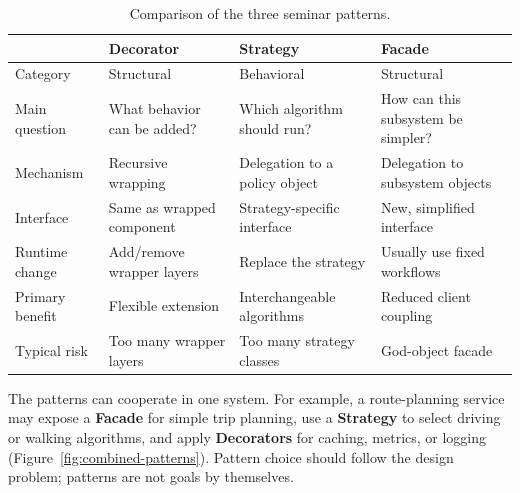 \documentclass[11pt,a4paper]{report}
\begin{document}
\begin{table}[htbp]
\centering
\caption{Comparison of the three seminar patterns.}
\small
\begin{tabularx}{\textwidth}{@{}lYYY@{}}
\toprule
 & \textbf{Decorator} & \textbf{Strategy} & \textbf{Facade} \\
\midrule
Category & Structural & Behavioral & Structural \\
Main question & What behavior can be added? & Which algorithm should run? & How can this subsystem be simpler? \\
Mechanism & Recursive wrapping & Delegation to a policy object & Delegation to subsystem objects \\
Interface & Same as wrapped component & Strategy-specific interface & New, simplified interface \\
Runtime change & Add/remove wrapper layers & Replace the strategy & Usually use fixed workflows \\
Primary benefit & Flexible extension & Interchangeable algorithms & Reduced client coupling \\
Typical risk & Too many wrapper layers & Too many strategy classes & God-object facade \\
\bottomrule
\end{tabularx}
\end{table}

The patterns can cooperate in one system. For example, a route-planning service
may expose a \textbf{Facade} for simple trip planning, use a \textbf{Strategy}
to select driving or walking algorithms, and apply \textbf{Decorators} for
caching, metrics, or logging (Figure~\ref{fig:combined-patterns}). Pattern choice should follow the design problem;
patterns are not goals by themselves.
\end{document}

